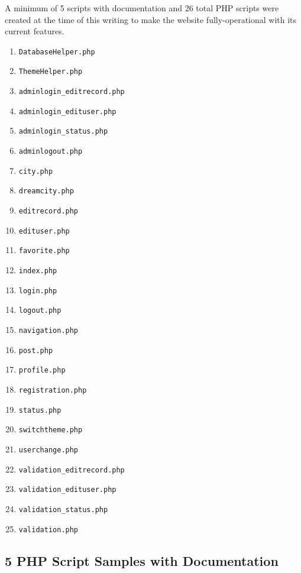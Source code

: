 \documentclass[12pt, letterpaper]{article}
\begin{document}
A minimum of 5 scripts with documentation and 26 total PHP scripts were created at the time of this writing to make the website fully-operational with its current features.
\begin{enumerate}
	\item \lstinline{DatabaseHelper.php}
	\item \lstinline{ThemeHelper.php}
	\item \lstinline{adminlogin_editrecord.php}
	\item \lstinline{adminlogin_edituser.php}
	\item \lstinline{adminlogin_status.php}
	\item \lstinline{adminlogout.php}
	\item \lstinline{city.php}
	\item \lstinline{dreamcity.php}
	\item \lstinline{editrecord.php}
	\item \lstinline{edituser.php}
	\item \lstinline{favorite.php}
	\item \lstinline{index.php}
	\item \lstinline{login.php}
	\item \lstinline{logout.php}
	\item \lstinline{navigation.php}
	\item \lstinline{post.php}
	\item \lstinline{profile.php}
	\item \lstinline{registration.php}
	\item \lstinline{status.php}
	\item \lstinline{switchtheme.php}
	\item \lstinline{userchange.php}
	\item \lstinline{validation_editrecord.php}
	\item \lstinline{validation_edituser.php}
	\item \lstinline{validation_status.php}
	\item \lstinline{validation.php}
\end{enumerate}

\newpage
\subsection*{5 PHP Script Samples with Documentation}

\end{document}

